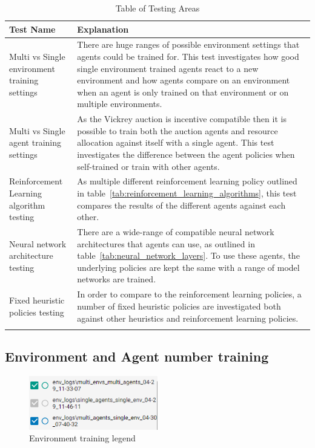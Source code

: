 \begin{longtable}{|p{4cm}|p{10cm}|} \hline
    Test Name & Explanation \\ \hline
    Multi vs Single environment training settings & There are huge ranges of possible environment settings that
        agents could be trained for. This test investigates how good single environment trained agents react to
        a new environment and how agents compare on an environment when an agent is only trained on that
        environment or on multiple environments. \\ \hline
    Multi vs Single agent training settings & As the Vickrey auction is incentive compatible then it is
        possible to train both the auction agents and resource allocation against itself with a single agent. This
        test investigates the difference between the agent policies when self-trained or train with other
        agents. \\ \hline
    Reinforcement Learning algorithm testing & As multiple different reinforcement learning policy outlined in
        table~\ref{tab:reinforcement_learning_algorithms}, this test compares the results of the different agents
        against each other. \\ \hline
    Neural network architecture testing & There are a wide-range of compatible neural network architectures that
        agents can use, as outlined in table~\ref{tab:neural_network_layers}. To use these agents, the underlying
        policies are kept the same with a range of model networks are trained. \\ \hline
    Fixed heuristic policies testing & In order to compare to the reinforcement learning policies, a number of
        fixed heuristic policies are investigated both against other heuristics and reinforcement learning
        policies. \\ \hline
    \caption{Table of Testing Areas}
    \label{tab:testing_areas}
\end{longtable}

\subsection{Environment and Agent number training}\label{subsec:environment-and-agent-number-training}

\begin{figure}
    \includegraphics[width=0.5\textwidth]{figures/env_training_fig/legend.png}
    \caption{Environment training legend}
    \label{fig:env-training-legend}
\end{figure}

